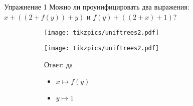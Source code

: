 \begin{frame}{Упражнение 1}
Можно ли проунифицировать два выражения: $x+((2+f(y))+y)$ и  $f(y)+((2+x)+1)$?
\vspace{1em}

\begin{figure}[ht]
\begin{subfigure}{.35\textwidth}
\texttt{[image: tikzpics/uniftrees2.pdf]}
\end{subfigure}
\begin{subfigure}{.35\textwidth}
\texttt{[image: tikzpics/uniftrees2.pdf]}
\end{subfigure}
\begin{subfigure}{.25\textwidth}
Ответ: да
\begin{itemize}
\item $x \mapsto f(y)$ 
\item $y \mapsto 1$
\end{itemize}
\end{subfigure}
\end{figure}
\end{frame}

